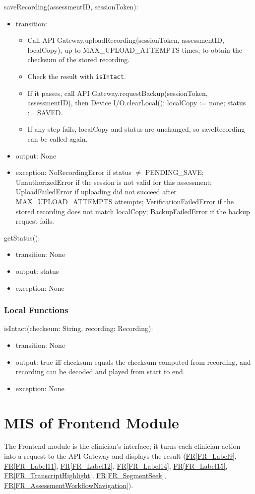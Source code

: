 \documentclass[12pt, titlepage]{article}
\newcommand{\srsref}[2]{\href{https://github.com/Nour-Fawaz/MacaBoca/blob/main/pdfs/SRS/SRS.pdf}{#1\ref*{#2}}}
\begin{document}
\noindent saveRecording(assessmentID, sessionToken):
\begin{itemize}
\item transition:
  \begin{itemize}
  \item Call API Gateway.uploadRecording(sessionToken, assessmentID, localCopy), up to MAX\_UPLOAD\_ATTEMPTS times, to obtain the checksum of the stored recording.
  \item Check the result with \texttt{isIntact}.
  \item If it passes, call API Gateway.requestBackup(sessionToken, assessmentID), then Device I/O.clearLocal(); localCopy := none; status := SAVED.
  \item If any step fails, localCopy and status are unchanged, so saveRecording can be called again.
  \end{itemize}
\item output: None
\item exception: NoRecordingError if status $\neq$ PENDING\_SAVE; UnauthorizedError if the session is not valid for this assessment; UploadFailedError if uploading did not succeed after MAX\_UPLOAD\_ATTEMPTS attempts; VerificationFailedError if the stored recording does not match localCopy; BackupFailedError if the backup request fails.
\end{itemize}

\noindent getStatus():
\begin{itemize}
\item transition: None
\item output: status
\item exception: None
\end{itemize}

\subsubsection{Local Functions}

\noindent isIntact(checksum: String, recording: Recording):
\begin{itemize}
\item transition: None
\item output: true iff checksum equals the checksum computed from recording, and recording can be decoded and played from start to end.
\item exception: None
\end{itemize}

\newpage
\section{MIS of Frontend Module} \label{Frontend}
The Frontend module is the clinician's interface; it turns each clinician action into a request to the API Gateway and displays the result (\srsref{FR}{FR_Label9}, \srsref{FR}{FR_Label11}, \srsref{FR}{FR_Label12}, \srsref{FR}{FR_Label14}, \srsref{FR}{FR_Label15}, \srsref{FR}{FR_TranscriptHighlight}, \srsref{FR}{FR_SegmentSeek}, \srsref{FR}{FR_AssessmentWorkflowNavigation}).
\end{document}
